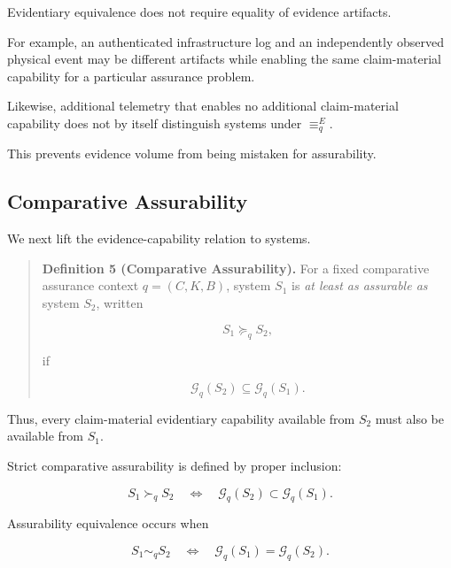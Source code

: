 Evidentiary equivalence does not require equality of evidence artifacts.

For example, an authenticated infrastructure log and an independently observed physical event may be different artifacts while enabling the same claim-material capability for a particular assurance problem.

Likewise, additional telemetry that enables no additional claim-material capability does not by itself distinguish systems under \(\equiv_q^E\).

This prevents evidence volume from being mistaken for assurability.

\subsection{Comparative Assurability}
\label{aa.subsec.comparative-assurability}

We next lift the evidence-capability relation to systems.

\begin{quote}
  \textbf{Definition 5 (Comparative Assurability).}
  For a fixed comparative assurance context \(q=(C,K,B)\), system \(S_1\) is \emph{at least as assurable as} system \(S_2\), written

  \begin{equation}
    S_1 \succeq_q S_2,
    \label{eq:assurability-preorder}
  \end{equation}

  if

  \begin{equation}
    \mathcal{G}_q(S_2)
    \subseteq
    \mathcal{G}_q(S_1).
    \label{eq:capability-containment}
  \end{equation}
\end{quote}

Thus, every claim-material evidentiary capability available from \(S_2\) must also be available from \(S_1\).

Strict comparative assurability is defined by proper inclusion:

\begin{equation}
  S_1 \succ_q S_2
  \quad\Longleftrightarrow\quad
  \mathcal{G}_q(S_2)
  \subset
  \mathcal{G}_q(S_1).
  \label{eq:strict-assurability}
\end{equation}

Assurability equivalence occurs when

\begin{equation}
  S_1 \sim_q S_2
  \quad\Longleftrightarrow\quad
  \mathcal{G}_q(S_1)
  =
  \mathcal{G}_q(S_2).
  \label{eq:assurability-equivalence}
\end{equation}

